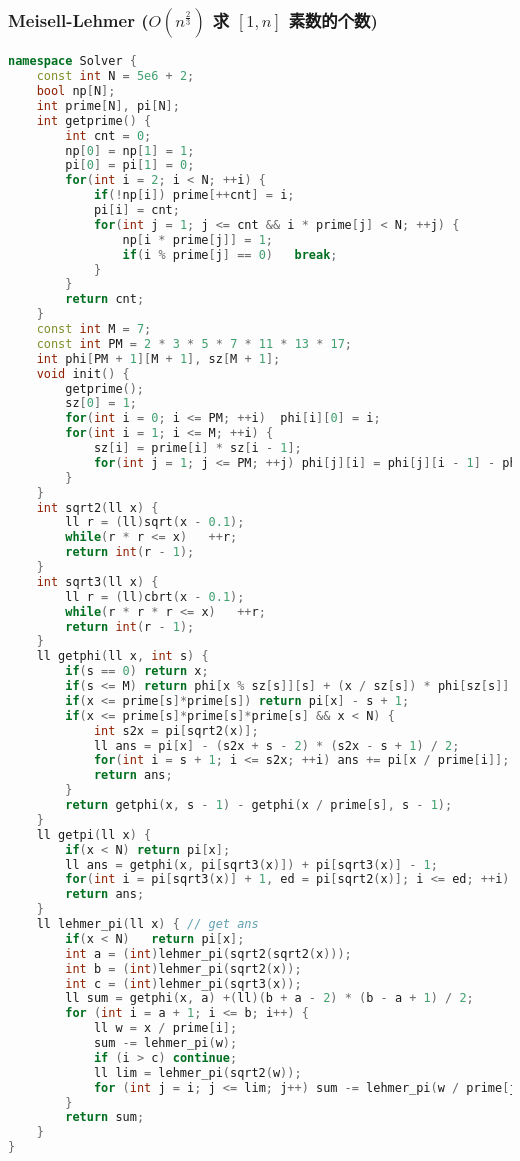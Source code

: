 \subsubsection{Meisell-Lehmer ($O(n ^ {\frac{2}{3}})$ 求 $[1,  n]$ 素数的个数)}

\begin{lstlisting}[language=C++]
namespace Solver {
    const int N = 5e6 + 2;
    bool np[N];
    int prime[N], pi[N];
    int getprime() {
        int cnt = 0;
        np[0] = np[1] = 1;
        pi[0] = pi[1] = 0;
        for(int i = 2; i < N; ++i) {
            if(!np[i]) prime[++cnt] = i;
            pi[i] = cnt;
            for(int j = 1; j <= cnt && i * prime[j] < N; ++j) {
                np[i * prime[j]] = 1;
                if(i % prime[j] == 0)   break;
            }
        }
        return cnt;
    }
    const int M = 7;
    const int PM = 2 * 3 * 5 * 7 * 11 * 13 * 17;
    int phi[PM + 1][M + 1], sz[M + 1];
    void init() {
        getprime();
        sz[0] = 1;
        for(int i = 0; i <= PM; ++i)  phi[i][0] = i;
        for(int i = 1; i <= M; ++i) {
            sz[i] = prime[i] * sz[i - 1];
            for(int j = 1; j <= PM; ++j) phi[j][i] = phi[j][i - 1] - phi[j / prime[i]][i - 1];
        }
    }
    int sqrt2(ll x) {
        ll r = (ll)sqrt(x - 0.1);
        while(r * r <= x)   ++r;
        return int(r - 1);
    }
    int sqrt3(ll x) {
        ll r = (ll)cbrt(x - 0.1);
        while(r * r * r <= x)   ++r;
        return int(r - 1);
    }
    ll getphi(ll x, int s) {
        if(s == 0) return x;
        if(s <= M) return phi[x % sz[s]][s] + (x / sz[s]) * phi[sz[s]][s];
        if(x <= prime[s]*prime[s]) return pi[x] - s + 1;
        if(x <= prime[s]*prime[s]*prime[s] && x < N) {
            int s2x = pi[sqrt2(x)];
            ll ans = pi[x] - (s2x + s - 2) * (s2x - s + 1) / 2;
            for(int i = s + 1; i <= s2x; ++i) ans += pi[x / prime[i]];
            return ans;
        }
        return getphi(x, s - 1) - getphi(x / prime[s], s - 1);
    }
    ll getpi(ll x) {
        if(x < N) return pi[x];
        ll ans = getphi(x, pi[sqrt3(x)]) + pi[sqrt3(x)] - 1;
        for(int i = pi[sqrt3(x)] + 1, ed = pi[sqrt2(x)]; i <= ed; ++i) ans -= getpi(x / prime[i]) - i + 1;
        return ans;
    }
    ll lehmer_pi(ll x) { // get ans
        if(x < N)   return pi[x];
        int a = (int)lehmer_pi(sqrt2(sqrt2(x)));
        int b = (int)lehmer_pi(sqrt2(x));
        int c = (int)lehmer_pi(sqrt3(x));
        ll sum = getphi(x, a) +(ll)(b + a - 2) * (b - a + 1) / 2;
        for (int i = a + 1; i <= b; i++) {
            ll w = x / prime[i];
            sum -= lehmer_pi(w);
            if (i > c) continue;
            ll lim = lehmer_pi(sqrt2(w));
            for (int j = i; j <= lim; j++) sum -= lehmer_pi(w / prime[j]) - (j - 1);
        }
        return sum;
    }
}
\end{lstlisting}

